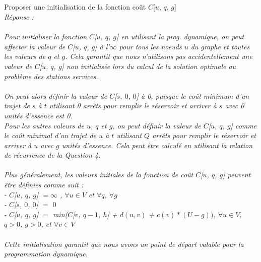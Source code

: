 \documentclass[a4paper,11pt]{article}
\begin{document}
        \subsection{}\label{subsec:Q5}
        Proposer une initialisation de la fonction coût $C$[$u$, $q$, $g$]
            \\\textit{Réponse : \\\\
            Pour initialiser la fonction $C$[$u$, $q$, $g$] en utilisant la prog. dynamique, on peut affecter la valeur de $C$[$u$, $q$, $g$] à l'$\infty$ pour tous les noeuds $u$ du graphe et toutes les valeurs de $q$ et $g$. Cela garantit que nous n'utilisons pas accidentellement une valeur de $C$[$u$, $q$,  $g$] non initialisée lors du calcul de la solution optimale au problème des stations services.\\\\
On peut alors définir la valeur de $C$[$s$, $0$, $0$] à 0, puisque le coût minimum d'un trajet de $s$ à $t$ utilisant 0 arrêts pour remplir le réservoir et arriver à $s$ avec 0 unités d'essence est 0.\\
Pour les autres valeurs de $u$, $q$ et $g$, on peut définir la valeur de $C$[$u$, $q$, $g$] comme le coût minimal d'un trajet de $u$ à $t$ utilisant $Q$ arrêts pour remplir le réservoir et arriver à $u$ avec $g$ unités d'essence. Cela peut être calculé en utilisant la relation de récurrence de la Question 4.\\\\
Plus généralement, les valeurs initiales de la fonction de coût $C$[$u$, $q$, $g$] peuvent être définies comme suit :\\
- $C$[$u$, $q$, $g$] $= \infty$ , $\forall u \in V$ et $\forall q$, $\forall g$\\
- $C$[$s$, $0$, $0$] $=$ $0$\\
- $C$[$u$, $q$, $g$] $=$ min($C$[$v$, $q - 1$, $h$] + $d(u, v)$ + $c(v) * (U - g))$, $\forall u \in V$, $q > 0$, $g > 0$, et $\forall v \in V$\\\\
Cette initialisation garantit que nous avons un point de départ valable pour la programmation dynamique.}
            
\end{document}
